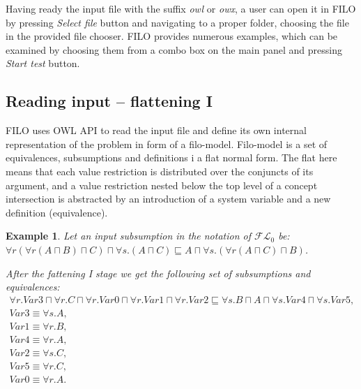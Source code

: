 \documentclass{article}
\newtheorem{example}{Example}
\newcommand{\barbara}[1]{\todo[inline, color=blue!40]{#1}}
\newcommand{\flo}{\ensuremath{\mathcal{FL}_0}\xspace}
\begin{document}

Having ready the input file with the suffix \emph{owl} or \emph{owx}, a user can open it in FILO by pressing
\emph{Select file} button and navigating to a proper folder, choosing the file in the provided file chooser.
FILO provides numerous examples, which can be examined by choosing them from a combo box on the main panel and
pressing \emph{Start test} button.

	
	\subsection{Reading input -- flattening I}
	FILO uses OWL API to read the input file and define its own internal representation of the problem in form of a filo-model. Filo-model is a set of equivalences, subsumptions and definitions i a flat normal form.
	The flat here means that each value restriction is distributed over the conjuncts of its argument, and a  value restriction nested below the top level of a concept intersection is abstracted by an introduction of a system variable and a new definition (equivalence).
	
	\begin{example}\label{example:flatteningI}
		Let an input subsumption in the notation of \flo be:\\
		$\forall r(\forall r(A \sqcap B) \sqcap C) \sqcap \forall s.(A \sqcap C) \sqsubseteq A \sqcap \forall s.(\forall r(A \sqcap C) \sqcap B)$.
		
		After the fattening I stage we get the following set of subsumptions and equivalences:\\
		$\begin{array}{l}
		\forall r.Var3 \sqcap \forall r.C \sqcap \forall r.Var0 \sqcap \forall r.Var1 \sqcap \forall r.Var2 \sqsubseteq \forall s.B \sqcap A \sqcap \forall s.Var4 \sqcap \forall s.Var5,\\
		Var3 \equiv \forall s. A,\\
		Var1\equiv\forall r. B,\\
		Var4\equiv\forall r.A,\\		
		Var2\equiv \forall s.C,\\
		Var5 \equiv\forall r.C,\\
		Var0 \equiv \forall r.A.
		\end{array}$
	\end{example}
\end{document}
